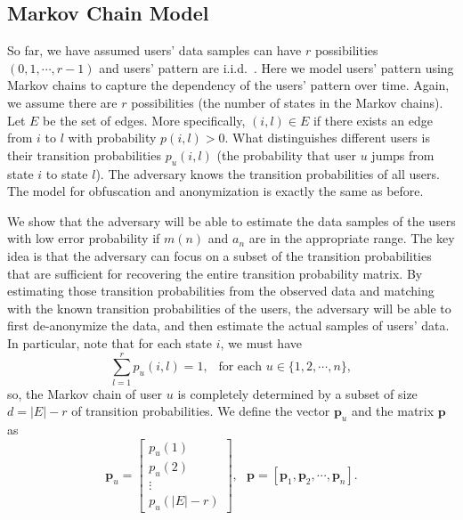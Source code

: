 \subsection{Markov Chain Model} 
\label{subsec:markov}

So far, we have assumed users' data samples can have $r$ possibilities $\left(0, 1, \cdots, r-1\right)$ and users' pattern are i.i.d.\ . Here we model users' pattern using Markov chains to capture the dependency of the users' pattern over time. Again, we assume there are $r$ possibilities (the number of states in the Markov chains). Let $E$ be the set of edges. More specifically, $(i, l) \in E$ if there exists an edge from $i$ to $l$ with probability $ p(i,l)>0 $. What distinguishes different users is their transition probabilities $p_u(i,l)$ (the probability that user $u$ jumps from state $i$ to state $l$). The adversary knows the transition probabilities of all users. The model for obfuscation and anonymization is exactly the same as before.

We show that the adversary will be able to estimate the data samples of the users with low error probability if $m(n)$ and $a_n$ are in the appropriate range. The key idea is that the adversary can focus on a subset of the transition probabilities that are sufficient for recovering the entire transition probability matrix. By estimating those transition probabilities from the observed data and matching with the known transition probabilities of the users, the adversary will be able to first de-anonymize the data, and then estimate the actual samples of users' data. In particular, note that for each state $i$, we must have
\[\sum\limits_{l=1}^{r} p_u(i,l)=1,   \  \  \textrm{ for each }u \in \{1,2,\cdots, n \}, \]
so, the Markov chain of user $u$ is completely determined by a subset of size $d=|E|-r$ of transition probabilities. We define the vector $\textbf{p}_u$ and the matrix $\textbf{p}$ as
\[\textbf{p}_u= \begin{bmatrix}
p_u(1) \\ p_u(2) \\ \vdots \\p_u(|E|-r) \end{bmatrix} , \ \ \  \textbf{p} =\left[ \textbf{p}_{1}, \textbf{p}_{2}, \cdots,  \textbf{p}_{n}\right].
\]


